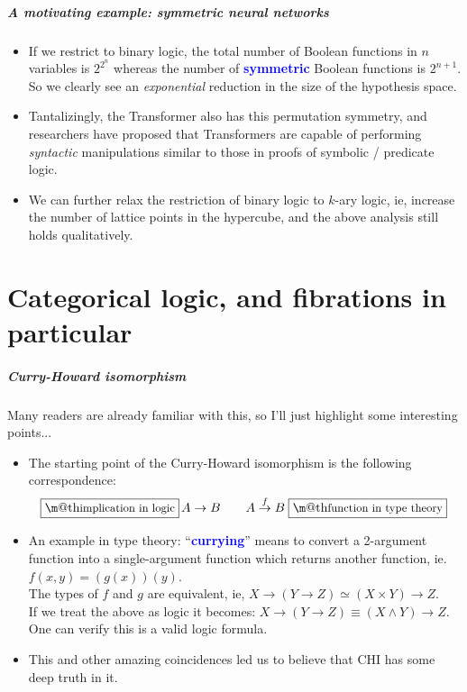 \documentclass[16pt]{beamer}
\makeatletter
\let\oldtextbf\textbf
\renewcommand{\textbf}[1]{\textcolor{blue}{\oldtextbf{#1}}}
\renewcommand{\boxed}[1]{\fbox{\m@th$\displaystyle\scalebox{0.9}{#1}$} \,}
\makeatother
\begin{document}
\begin{frame}
	\frametitle{A motivating example: symmetric neural networks}
	\begin{itemize}
		\item If we restrict to binary logic, the total number of Boolean functions in $n$ variables is $2^{2^n}$ whereas the number of \textbf{symmetric} Boolean functions is $2^{n+1}$.  So we clearly see an \textit{exponential} reduction in the size of the hypothesis space.
		
		\item Tantalizingly, the Transformer also has this permutation symmetry, and researchers have proposed that Transformers are capable of performing \textit{syntactic} manipulations similar to those in proofs of symbolic / predicate logic.
		
		\item We can further relax the restriction of binary logic to $k$-ary logic, ie, increase the number of lattice points in the hypercube, and the above analysis still holds qualitatively.
	\end{itemize}
\end{frame}

\part{Categorical logic, and fibrations in particular}
\frame{\partpage}

\begin{frame}
\frametitle{Curry-Howard isomorphism}
Many readers are already familiar with this, so I'll just highlight some interesting points...
\begin{itemize}
	\item The starting point of the Curry-Howard isomorphism is the following correspondence:
	\begin{equation}
		\boxed{implication in logic} A \rightarrow B \qquad A \stackrel{f}{\rightarrow} B \; \boxed{function in type theory}
		\nonumber
	\end{equation}
	\item An example in type theory: ``\textbf{currying}'' means to convert a 2-argument function into a single-argument function which returns another function, ie. $f(x,y) = (g(x))(y)$.  \\
	The types of $f$ and $g$ are equivalent, ie, $X \rightarrow (Y \rightarrow Z) \simeq (X \times Y) \rightarrow Z$. \\
	If we treat the above as logic it becomes: $X \rightarrow (Y \rightarrow Z) \equiv (X \wedge Y) \rightarrow Z$.  One can verify this is a valid logic formula.
	\item This and other amazing coincidences led us to believe that CHI has some deep truth in it.
\end{itemize}
\end{frame}
\end{document}
